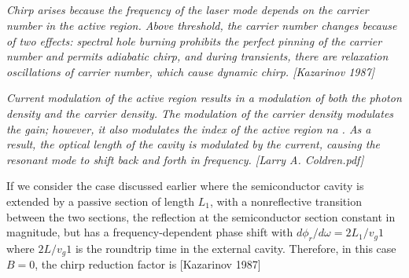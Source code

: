 \subsection{}
\textit{Chirp arises because the frequency of the laser mode depends on the carrier number in the active region. Above threshold, the carrier number changes because of two effects: spectral hole burning prohibits the perfect pinning of the carrier number and permits adiabatic chirp, and during transients, there are relaxation oscillations of carrier number, which cause dynamic chirp. [Kazarinov 1987]}

\textit{Current modulation of the active region results in a modulation of both the photon density and the carrier density. The modulation of the carrier density modulates the gain; however, it also modulates the index of the active region na . As a result, the optical length of the cavity is modulated by the current, causing the resonant mode to shift back and forth in frequency. [Larry A. Coldren.pdf]}

If we consider the case discussed earlier where the semiconductor cavity is extended by a passive section of length $L_1$, with a nonreflective transition between the two sections, the reflection at the semiconductor section constant in magnitude, but has a frequency-dependent phase shift with $d\phi_r/d\omega = 2L_1/v_g1$ where $2L/v_g1$ is the roundtrip time in the external cavity. Therefore, in this case $B=0$, the chirp reduction factor is [Kazarinov 1987]



